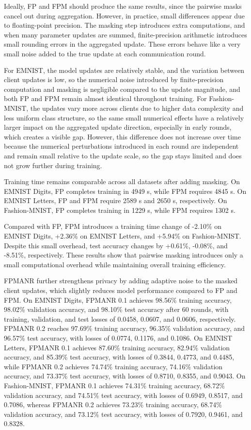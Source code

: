 \documentclass[a4paper,fleqn]{cas-dc}
\begin{document}
Ideally, FP and FPM should produce the same results, since the pairwise masks cancel out during aggregation. However, in practice, small differences appear due to floating-point precision. The masking step introduces extra computations, and when many parameter updates are summed, finite-precision arithmetic introduces small rounding errors in the aggregated update. These errors behave like a very small noise added to the true update at each communication round.

For EMNIST, the model updates are relatively stable, and the variation between client updates is low, so the numerical noise introduced by finite-precision computation and masking is negligible compared to the update magnitude, and both FP and FPM remain almost identical throughout training. For Fashion-MNIST, the updates vary more across clients due to higher data complexity and less uniform class structure, so the same small numerical effects have a relatively larger impact on the aggregated update direction, especially in early rounds, which creates a visible gap. However, this difference does not increase over time because the numerical perturbations introduced in each round are independent and remain small relative to the update scale, so the gap stays limited and does not grow further during training.

Training time remains comparable across all datasets after adding masking. On EMNIST Digits, FP completes training in 4949 s, while FPM requires 4845 s. On EMNIST Letters, FP and FPM require 2589 s and 2650 s, respectively. On Fashion-MNIST, FP completes training in 1229 s, while FPM requires 1302 s.

Compared with FP, FPM introduces a training time change of -2.10\% on EMNIST Digits, +2.36\% on EMNIST Letters, and +5.94\% on Fashion-MNIST. Despite this small overhead, test accuracy changes by +0.61\%, -0.08\%, and -8.51\%, respectively. These results show that pairwise masking introduces only a small computational overhead while maintaining overall training efficiency.

FPMANR further strengthens privacy by adding adaptive noise to the masked client updates, which slightly reduces model performance compared to FP and FPM. On EMNIST Digits, FPMANR 0.1 achieves 98.56\% training accuracy, 98.02\% validation accuracy, and 98.10\% test accuracy after 60 rounds, with training, validation, and test losses of 0.0458, 0.0607, and 0.0606, respectively. FPMANR 0.2 reaches 97.69\% training accuracy, 96.35\% validation accuracy, and 96.57\% test accuracy, with losses of 0.0774, 0.1176, and 0.1086. On EMNIST Letters, FPMANR 0.1 achieves 87.60\% training accuracy, 82.94\% validation accuracy, and 85.39\% test accuracy, with losses of 0.3844, 0.4773, and 0.4485, while FPMANR 0.2 achieves 74.74\% training accuracy, 74.16\% validation accuracy, and 73.37\% test accuracy, with losses of 0.8710, 0.8355, and 0.9043. On Fashion-MNIST, FPMANR 0.1 achieves 74.31\% training accuracy, 68.72\% validation accuracy, and 74.51\% test accuracy, with losses of 0.6949, 0.8517, and 0.7086, whereas FPMANR 0.2 achieves 73.23\% training accuracy, 68.74\% validation accuracy, and 73.12\% test accuracy, with losses of 0.7920, 0.9461, and 0.8328.
\end{document}
